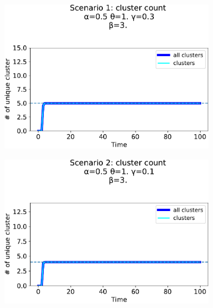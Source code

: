 \begin{figure}[t]
  \centering
  \begin{subfigure}[b]{0.32\textwidth}
    \centering
    \includegraphics[width=\textwidth]{papers/swarm-intelligence2021/img/simulations/standard_cluster_count.pdf}
  \end{subfigure}
  \hfill
  \centering
  \begin{subfigure}[b]{0.32\textwidth}
    \centering
    \includegraphics[width=\textwidth]{papers/swarm-intelligence2021/img/simulations/stretched_cluster_count.pdf}
  \end{subfigure}
  \hfill
  \centering
  \begin{subfigure}[b]{0.32\textwidth}
    \centering

\end{subfigure}
\end{figure}
